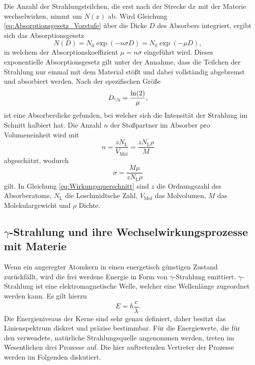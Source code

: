 Die Anzahl der Strahlungsteilchen, die erst nach der Strecke $\mathup{d}x$ mit der Materie wechselwirken, nimmt um $N(x)$ ab. 
Wird Gleichung \eqref{eq:Absorptionsgesetz_Vorstufe} über die Dicke $D$ des Absorbers integriert, ergibt sich das Absorptionsgesetz
\begin{equation}
	N(D)=N_0 \exp(-n \sigma D)=N_0 \exp(-\mu D),
	\label{eq:Absorptionsgesetz}
\end{equation}
in welchem der Absorptionskoeffizient $\mu=n\sigma$ eingeführt wird.
Dieses exponentielle Absorptionsgesetz gilt unter der Annahme, dass die Teilchen der Strahlung nur einmal mit dem Material stößt und dabei vollständig abgebremst und absorbiert werden.
Nach der spezifischen Größe
\begin{equation}
	D_{\sfrac{1}{2}}=\frac{\ln(2)}{\mu},
\end{equation}
ist eine Absorberdicke gefunden, bei welcher sich die Intensität der Strahlung im Schnitt halbiert hat.
Die Anzahl $n$ der Stoßpartner im Absorber pro Volumeneinheit wird mit
\begin{equation}
	n=\frac{zN_\text{L}}{V_\text{Mol}}=\frac{zN_\text{L}\rho}{M}
\end{equation}
abgeschätzt, wodurch 
\begin{equation}
	\sigma=\frac{M\mu}{zN_\text{L}\rho}
	\label{eq:Wirkungsquerschnitt}
\end{equation}
gilt.
In Gleichung \ref{eq:Wirkungsquerschnitt} sind $z$ die Ordnungszahl des Absorberatoms, $N_\text{L}$ die Loschmidtsche Zahl, $V_\text{Mol}$ das Molvolumen, $M$ das Molekulargewicht und $\rho$ Dichte.

\subsection{\texorpdfstring{$\gamma$}{Gamma}-Strahlung und ihre Wechselwirkungsprozesse mit Materie}
\label{sec:gamma}
Wenn ein angeregter Atomkern in einen energetisch günstigen Zustand zurückfällt, wird die frei werdene Energie in Form von $\gamma$-Strahlung emittiert. 
$\gamma$-Strahlung ist eine elektromagnetische Welle, welcher eine Wellenlänge zugeordnet werden kann. 
Es gilt hierzu
\begin{equation}
	E =h\frac{c}{\lambda}.
\end{equation}
Die Energieniveaus der Kerne sind sehr genau definiert, daher besitzt das Linienspektrum diskret und präzise bestimmbar.
Für die Energiewerte, die für den verwendete, natürliche Strahlungsquelle angenommen werden, treten im Wesentlichen drei Prozesse auf.
Die hier auftretenden Vertreter der Prozesse werden im Folgenden diskutiert.


